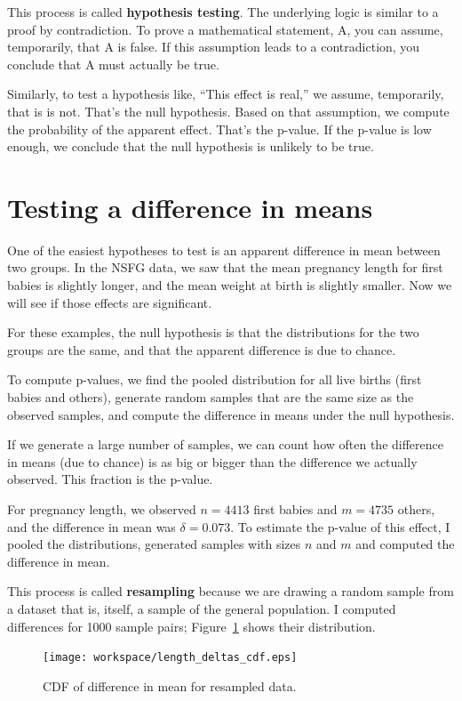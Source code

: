 \documentclass[12pt]{book}
\begin{document}
This process is called {\bf hypothesis testing}.  The underlying
logic is similar to a proof by contradiction.  To prove a mathematical
statement, A, you can assume, temporarily, that A is false.  If this
assumption leads to a contradiction, you conclude that A must actually
be true.

Similarly, to test a hypothesis like, ``This effect is real,'' we
assume, temporarily, that is is not.  That's the null hypothesis.
Based on that assumption, we compute the probability of the apparent
effect.  That's the p-value.  If the p-value is low enough, we
conclude that the null hypothesis is unlikely to be true.


\section{Testing a difference in means}

One of the easiest hypotheses to test is an apparent difference in mean
between two groups.  In the NSFG data, we saw that the mean pregnancy
length for first babies is slightly longer, and the mean weight at
birth is slightly smaller.  Now we will see if those effects are
significant.

For these examples, the null hypothesis is that the distributions
for the two groups are the same, and that the apparent difference is
due to chance.

To compute p-values, we find the pooled distribution for all live
births (first babies and others), generate random samples that are
the same size as the observed samples, and compute the difference
in means under the null hypothesis.

If we generate a large number of samples, we can count how often the
difference in means (due to chance) is as big or bigger than the
difference we actually observed.  This fraction is the p-value.

For pregnancy length, we observed $n=4413$ first babies and $m=4735$
others, and the difference in mean was $\delta=0.073$.  To estimate
the p-value of this effect, I pooled the distributions, generated
samples with sizes $n$ and $m$ and computed the difference in mean.

This process is called {\bf resampling} because we are drawing a
random sample from a dataset that is, itself, a sample of the general
population.  I computed differences for 1000 sample pairs;
Figure~\ref{length_deltas_cdf} shows their distribution.

\begin{figure}
\centerline{\texttt{[image: workspace/length\_deltas\_cdf.eps]}}
\caption{CDF of difference in mean for resampled data.}
\label{length_deltas_cdf}
\end{figure}
\end{document}
